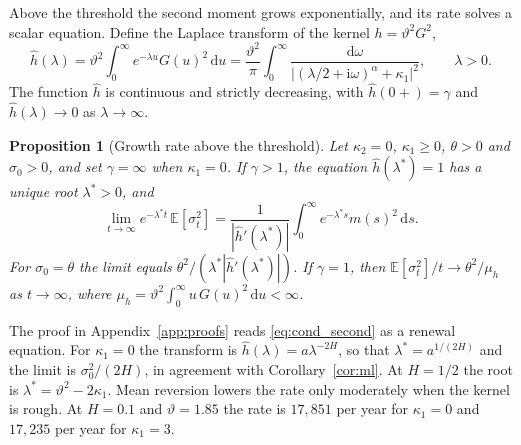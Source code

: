 \documentclass[11pt,a4paper]{article}
\newtheorem{proposition}[theorem]{Proposition}
\theoremstyle{definition}
\newcommand{\D}{\mathrm{d}}
\newcommand{\E}{\mathbb{E}}
\begin{document}
Above the threshold the second moment grows exponentially, and its rate solves a scalar equation. Define the Laplace transform of the kernel $h=\vartheta^2G^2$,
\begin{equation}\label{eq:h_hat}
\widehat h(\lambda)=\vartheta^2\int_0^\infty e^{-\lambda u}G(u)^2\,\D u
=\frac{\vartheta^2}{\pi}\int_0^\infty\frac{\D\omega}{\big|(\lambda/2+\mathrm{i}\omega)^\alpha+\kappa_1\big|^2},\qquad\lambda>0 .
\end{equation}
The function $\widehat h$ is continuous and strictly decreasing, with $\widehat h(0+)=\gamma$ and $\widehat h(\lambda)\to0$ as $\lambda\to\infty$.

\begin{proposition}[Growth rate above the threshold]\label{prop:growth}
Let $\kappa_2=0$, $\kappa_1\ge0$, $\theta>0$ and $\sigma_0>0$, and set $\gamma=\infty$ when $\kappa_1=0$. If $\gamma>1$, the equation $\widehat h(\lambda^*)=1$ has a unique root $\lambda^*>0$, and
\begin{equation}\label{eq:growth}
\lim_{t\to\infty}e^{-\lambda^*t}\,\E[\sigma_t^2]=\frac{1}{|\widehat h'(\lambda^*)|}\int_0^\infty e^{-\lambda^*s}m(s)^2\,\D s .
\end{equation}
For $\sigma_0=\theta$ the limit equals $\theta^2/(\lambda^*|\widehat h'(\lambda^*)|)$. If $\gamma=1$, then $\E[\sigma_t^2]/t\to\theta^2/\mu_h$ as $t\to\infty$, where $\mu_h=\vartheta^2\int_0^\infty u\,G(u)^2\,\D u<\infty$.
\end{proposition}

The proof in Appendix~\ref{app:proofs} reads \eqref{eq:cond_second} as a renewal equation. For $\kappa_1=0$ the transform is $\widehat h(\lambda)=a\lambda^{-2H}$, so that $\lambda^*=a^{1/(2H)}$ and the limit is $\sigma_0^2/(2H)$, in agreement with Corollary~\ref{cor:ml}. At $H=1/2$ the root is $\lambda^*=\vartheta^2-2\kappa_1$. Mean reversion lowers the rate only moderately when the kernel is rough. At $H=0.1$ and $\vartheta=1.85$ the rate is $17{,}851$ per year for $\kappa_1=0$ and $17{,}235$ per year for $\kappa_1=3$.
\end{document}
